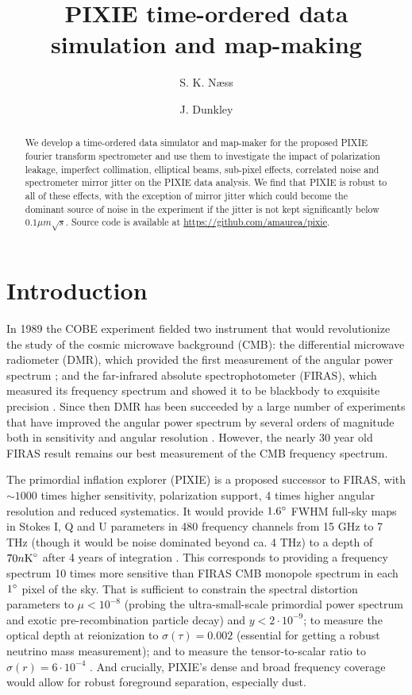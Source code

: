 \documentclass{article}
\title{PIXIE time-ordered data simulation and map-making}
\author[1,2]{S. K. Næss}
\author[2,3]{J. Dunkley}
\affil[1]{Center for Computational Astrophysics, Flatiron Institute}
\affil[2]{Oxford University}
\affil[3]{Princeton University}
\begin{document}
\maketitle
\begin{abstract}
	We develop a time-ordered data simulator and map-maker for the
	proposed PIXIE fourier transform spectrometer and use them to
	investigate the impact of polarization leakage, imperfect collimation,
	elliptical beams, sub-pixel effects, correlated noise and
	spectrometer mirror jitter on the PIXIE data analysis. We find
	that PIXIE is robust to all of these effects, with the exception
	of mirror jitter which could become the dominant source of noise
	in the experiment if the jitter is not kept significantly below
	$0.1\mu m\sqrt{s}$. Source code is available at \url{https://github.com/amaurea/pixie}.
\end{abstract}

\section{Introduction}
In 1989 the COBE experiment fielded two instrument that would revolutionize the
study of the cosmic microwave background (CMB): the differential microwave
radiometer (DMR), which provided the first measurement of the angular power
spectrum \citep{cobe-dmr-1992}; and the far-infrared absolute spectrophotometer (FIRAS), which
measured its frequency spectrum and showed it to be blackbody to exquisite
precision \citep{cobe-firas-1996}. Since then DMR has been succeeded by a large number of experiments
that have improved the angular power spectrum by several orders of magnitude
both in sensitivity and angular resolution \citep{bennett/etal/2013, planck_mission/2013, bicep2-planck, act-2017, spt-2017}. However, the nearly 30 year old
FIRAS result remains our best measurement of the CMB frequency spectrum.

The primordial inflation explorer (PIXIE) is a proposed successor to FIRAS,
with $\sim 1000$ times higher sensitivity, polarization support, 4 times
higher angular resolution and reduced systematics.
It would provide $1.6\degree$ FWHM full-sky maps in Stokes I, Q and U parameters
in 480 frequency channels from 15 GHz to 7 THz (though it would be noise dominated
beyond ca. 4 THz) to a depth of $70n\textrm{K}\degree$ after 4 years of integration
\citep{pixie2011}. This corresponds to providing a frequency spectrum 10 times more
sensitive than FIRAS CMB monopole spectrum in each $1\degree$ pixel of the sky.
That is sufficient to constrain the spectral distortion parameters to $\mu < 10^{-8}$
(probing the ultra-small-scale primordial power spectrum and exotic pre-recombination
particle decay) and $y < 2\cdot 10^{-9}$; to measure the optical depth at reionization
to $\sigma(\tau) = 0.002$ (essential for getting a robust neutrino mass measurement);
and to measure the tensor-to-scalar ratio to $\sigma(r) = 6\cdot 10^{-4}$ \citep{pixie-s4}.
And crucially, PIXIE's dense and broad frequency coverage would allow for robust
foreground separation, especially dust.
\end{document}
